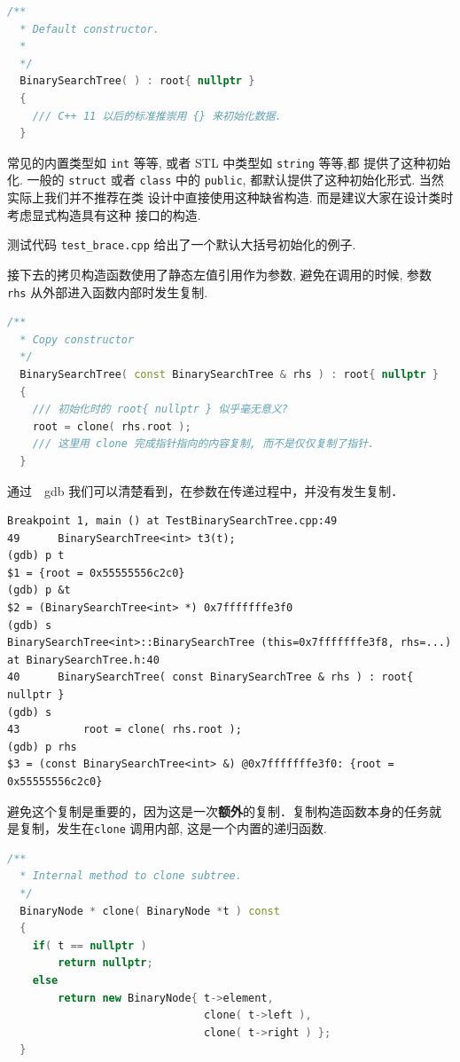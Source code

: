 \documentclass[a4paper]{ctexart}
\theoremstyle{definition}
\theoremstyle{definition}
\begin{document}
\begin{lstlisting}[language=C++]
  /** 
  * Default constructor. 
  * 
  */
  BinarySearchTree( ) : root{ nullptr } 
  {
    /// C++ 11 以后的标准推崇用 {} 来初始化数据.  
  }
\end{lstlisting}

常见的内置类型如 \verb|int| 等等, 或者 STL 中类型如 \verb|string| 等等,都
提供了这种初始化. 一般的 \verb|struct| 或者 \verb|class| 中的
\verb|public|, 都默认提供了这种初始化形式. 当然实际上我们并不推荐在类
设计中直接使用这种缺省构造. 而是建议大家在设计类时考虑显式构造具有这种
接口的构造. 

测试代码 \verb|test_brace.cpp| 给出了一个默认大括号初始化的例子.

接下去的拷贝构造函数使用了静态左值引用作为参数, 避免在调用的时候, 参数
\verb|rhs| 从外部进入函数内部时发生复制.

\begin{lstlisting}[language=C++]
  /**
  * Copy constructor
  */
  BinarySearchTree( const BinarySearchTree & rhs ) : root{ nullptr }
  {
    /// 初始化时的 root{ nullptr } 似乎毫无意义?
    root = clone( rhs.root );
    /// 这里用 clone 完成指针指向的内容复制, 而不是仅仅复制了指针.
  }
\end{lstlisting}

通过　gdb 我们可以清楚看到，在参数在传递过程中，并没有发生复制．

\begin{verbatim}
Breakpoint 1, main () at TestBinarySearchTree.cpp:49
49	    BinarySearchTree<int> t3(t);
(gdb) p t
$1 = {root = 0x55555556c2c0}
(gdb) p &t
$2 = (BinarySearchTree<int> *) 0x7fffffffe3f0
(gdb) s
BinarySearchTree<int>::BinarySearchTree (this=0x7fffffffe3f8, rhs=...) 
at BinarySearchTree.h:40
40	    BinarySearchTree( const BinarySearchTree & rhs ) : root{ nullptr }
(gdb) s
43			root = clone( rhs.root );
(gdb) p rhs
$3 = (const BinarySearchTree<int> &) @0x7fffffffe3f0: {root = 0x55555556c2c0}
\end{verbatim}

避免这个复制是重要的，因为这是一次{\bf 额外}的复制．复制构造函数本身的任务就
是复制，发生在\verb|clone| 调用内部, 这是一个内置的递归函数.

\begin{lstlisting}[language=C++]
  /**
  * Internal method to clone subtree.
  */
  BinaryNode * clone( BinaryNode *t ) const
  {
    if( t == nullptr )
        return nullptr;
    else
        return new BinaryNode{ t->element,
                               clone( t->left ),
                               clone( t->right ) };
  }
\end{lstlisting}
\end{document}
